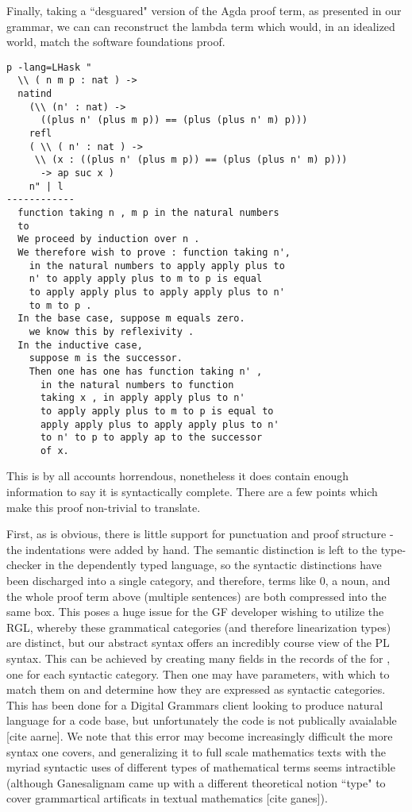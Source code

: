 Finally, taking a ``desguared" version of the Agda proof term, as presented in
our grammar, we can can reconstruct the lambda term which would, in an idealized
world, match the software foundations proof.

\begin{verbatim}
p -lang=LHask "
  \\ ( n m p : nat ) ->
  natind
    (\\ (n' : nat) ->
      ((plus n' (plus m p)) == (plus (plus n' m) p)))
    refl
    ( \\ ( n' : nat ) ->
     \\ (x : ((plus n' (plus m p)) == (plus (plus n' m) p)))
      -> ap suc x )
    n" | l
------------
  function taking n , m p in the natural numbers
  to
  We proceed by induction over n .
  We therefore wish to prove : function taking n',
    in the natural numbers to apply apply plus to
    n' to apply apply plus to m to p is equal
    to apply apply plus to apply apply plus to n'
    to m to p .
  In the base case, suppose m equals zero.
    we know this by reflexivity .
  In the inductive case,
    suppose m is the successor.
    Then one has one has function taking n' ,
      in the natural numbers to function
      taking x , in apply apply plus to n'
      to apply apply plus to m to p is equal to
      apply apply plus to apply apply plus to n'
      to n' to p to apply ap to the successor
      of x.
\end{verbatim}

This is by all accounts horrendous, nonetheless it does contain enough
information to say it is syntactically complete. There are a few points which
make this proof non-trivial to translate.

First, as is obvious, there is little support for punctuation and proof
structure - the indentations were added by hand. The semantic distinction is
left to the type-checker in the dependently typed language, so the syntactic
distinctions have been discharged into a single  category, and
therefore, terms like $0$, a noun, and the whole proof term above (multiple
sentences) are both compressed into the same box. This poses a huge issue for
the GF developer wishing to utilize the RGL, whereby these grammatical
categories (and therefore linearization types) are distinct, but our abstract
syntax offers an incredibly course view of the PL syntax. This can be achieved
by creating many fields in the records of the  for ,
one for each syntactic category. Then one may have parameters, with which to
match them on and determine how they are expressed as syntactic categories. This
has been done for a Digital Grammars client looking to produce natural language
for a code base, but unfortunately the code is not publically avaialable [cite
aarne]. We note that this error may become increasingly difficult the more
syntax one covers, and generalizing it to full scale mathematics texts with the
myriad syntactic uses of different types of mathematical terms seems intractible
(although Ganesalignam came up with a different theoretical notion ``type" to
cover grammartical artificats in textual mathematics [cite ganes]).

